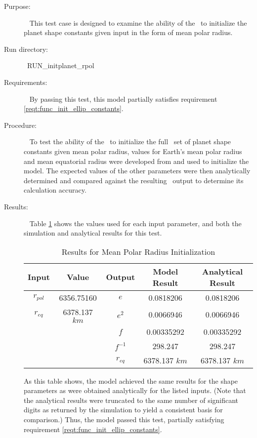 \label{test:init_rpol}
\begin{description}
\item[Purpose:]\ \newline
This test case is designed to examine the ability of the \planetDesc\ to
initialize the planet shape constants given input in the form of mean polar
radius.
\item[Run directory:]\ \newline RUN\_initplanet\_rpol
\item[Requirements:]\ \newline
By passing this test, this model partially satisfies requirement
\mbox{\ref{reqt:func_init_ellip_constants}}.

\item[Procedure:]\ \newline
To test the ability of the \planetDesc\ to initialize the full \JEODid\ set of
planet shape constants given mean polar radius, values for Earth's
mean polar radius and mean equatorial radius were developed from
\cite{ValladoSecond} and used to initialize the model.  The expected values of
the other parameters were then analytically determined and compared against the
resulting \planetDesc\ output to determine its calculation accuracy.

\item[Results:]\ \newline
Table \ref{rpol_init_table} shows the values used for each input parameter,
and both the simulation and analytical results for this test.

\begin{table}[ht]
\begin{center}
\begin{tabular}{|c|c|c|c|c|}\hline
 Input & Value & Output & Model Result & Analytical Result \\ \hline
 $r_{pol}$ & 6356.75160 & $e$ & 0.0818206 & 0.0818206 \\ \hline
 $r_{eq}$ & 6378.137 $km$ & $e^2$ & 0.0066946 & 0.0066946 \\ \hline
   &   & $f$ & 0.00335292 & 0.00335292 \\ \hline
   &   & $f^{-1}$ & 298.247 & 298.247 \\ \hline
   &   & $r_{eq}$ & 6378.137 $km$ & 6378.137 $km$ \\ \hline
\end{tabular}
\caption{Results for Mean Polar Radius Initialization}
\label{rpol_init_table}
\end{center}
\end{table}

As this table shows, the model achieved the same results for the shape
parameters as were obtained analytically for the listed inputs. (Note that the
analytical results were truncated to the same number of significant digits as
returned by the simulation to yield a consistent basis for comparison.) Thus,
the model passed this test, partially satisfying requirement
\mbox{\ref{reqt:func_init_ellip_constants}}.
\end{description}


